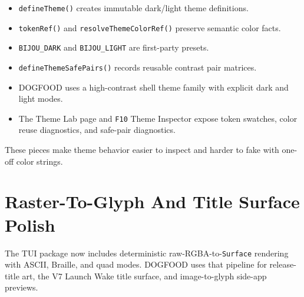 \begin{itemize}
\tightlist
\item
  \texttt{d\allowbreak{}e\allowbreak{}f\allowbreak{}i\allowbreak{}n\allowbreak{}e\allowbreak{}T\allowbreak{}h\allowbreak{}e\allowbreak{}m\allowbreak{}e\allowbreak{}(\allowbreak{})} creates immutable dark/light theme definitions.
\item
  \texttt{t\allowbreak{}o\allowbreak{}k\allowbreak{}e\allowbreak{}n\allowbreak{}R\allowbreak{}e\allowbreak{}f\allowbreak{}(\allowbreak{})} and \texttt{r\allowbreak{}e\allowbreak{}s\allowbreak{}o\allowbreak{}l\allowbreak{}v\allowbreak{}e\allowbreak{}T\allowbreak{}h\allowbreak{}e\allowbreak{}m\allowbreak{}e\allowbreak{}C\allowbreak{}o\allowbreak{}l\allowbreak{}o\allowbreak{}r\allowbreak{}R\allowbreak{}e\allowbreak{}f\allowbreak{}(\allowbreak{})} preserve semantic color facts.
\item
  \texttt{B\allowbreak{}I\allowbreak{}J\allowbreak{}O\allowbreak{}U\allowbreak{}\_\allowbreak{}D\allowbreak{}A\allowbreak{}R\allowbreak{}K} and \texttt{B\allowbreak{}I\allowbreak{}J\allowbreak{}O\allowbreak{}U\allowbreak{}\_\allowbreak{}L\allowbreak{}I\allowbreak{}G\allowbreak{}H\allowbreak{}T} are first-party presets.
\item
  \texttt{d\allowbreak{}e\allowbreak{}f\allowbreak{}i\allowbreak{}n\allowbreak{}e\allowbreak{}T\allowbreak{}h\allowbreak{}e\allowbreak{}m\allowbreak{}e\allowbreak{}S\allowbreak{}a\allowbreak{}f\allowbreak{}e\allowbreak{}P\allowbreak{}a\allowbreak{}i\allowbreak{}r\allowbreak{}s\allowbreak{}(\allowbreak{})} records reusable contrast pair matrices.
\item
  DOGFOOD uses a high-contrast shell theme family with explicit dark and light modes.
\item
  The Theme Lab page and \texttt{F\allowbreak{}1\allowbreak{}0} Theme Inspector expose token swatches, color reuse diagnostics, and safe-pair diagnostics.
\end{itemize}

These pieces make theme behavior easier to inspect and harder to fake with one-off color strings.

\section{Raster-To-Glyph And Title Surface Polish}\label{record-282-raster-to-glyph-and-title-surface-polish}

The TUI package now includes deterministic raw-RGBA-to-\texttt{S\allowbreak{}u\allowbreak{}r\allowbreak{}f\allowbreak{}a\allowbreak{}c\allowbreak{}e} rendering with ASCII, Braille, and quad modes. DOGFOOD uses that pipeline for release-title art, the V7 Launch Wake title surface, and image-to-glyph side-app previews.

